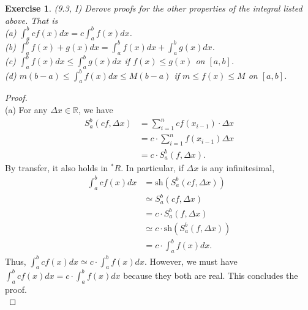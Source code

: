 \documentclass[a4paper, 11pt, openany]{book}
\theoremstyle{plain}
\newtheorem{exercise}{Exercise}[chapter]
\theoremstyle{plain}
\newcommand{\R}{\mathbb{R}}
\newcommand{\hyp}{{}^*}
\newcommand{\sh}{\text{sh}}
\newcommand{\Del}{\Delta}
\begin{document}
    \begin{exercise}
      (9.3, I)
      Derove proofs for the other properties of the integral listed above. That is \\
      (a) $\int_a^b c f(x) dx= c \int_a^b f(x) dx$. \\
      (b) $\int_a^b f(x)+g(x) dx= \int_a^b f(x) dx + \int_a^b g(x) dx$. \\
      (c) $\int_a^b f(x) dx \leq \int_a^b g(x) dx$ if $f(x) \leq g(x)$ on $[a,b]$. \\
      (d) $m(b-a) \leq \int_a^b f(x) dx \leq M (b-a)$ if $m \leq f(x) \leq M$ on $[a,b]$.
    \end{exercise}
    \begin{proof} $ $ \\
      (a) For any $\Del x \in \R$, we have 
        \begin{align*}
          S_a^b (cf, \Del x) &= \sum_{i=1}^n cf(x_{i-1}) \cdot \Del x \\
          &=c \cdot \sum_{i=1}^n f(x_{i-1}) \Del x \\
          &= c \cdot S_a^b (f,\Del x).
        \end{align*}
        By transfer, it also holds in $\hyp R$. In particular, if $\Del x$ is any infinitesimal, 
        \begin{align*}
          \int_a^b cf(x)dx &= \sh \left( S_a^b (cf, \Del x)\right) \\
          &\simeq S_a^b (cf, \Del x) \\
          &= c \cdot S_a^b (f, \Del x) \\
          &\simeq c \cdot \sh \left( S_a^b (f, \Del x)\right) \\
          &=c \cdot \int_a^b f(x) dx.
        \end{align*}
         Thus, $\int_a^b cf(x)dx \simeq c \cdot \int_a^b f(x) dx$. However, we must have $\int_a^b cf(x)dx = c \cdot \int_a^b f(x) dx$ because they both are real. This concludes the proof.  \\


\end{proof}
\end{document}

